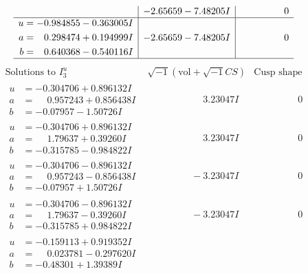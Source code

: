 \documentclass[1p]{elsarticle_modified}
\theoremstyle{definition}
\newcommand{\I}{\sqrt{-1}}
\begin{document}
$$\begin{array}{c|c|c}
 & -2.65659 - 7.48205 I & \phantom{-0.000000 } 0 \\ \hline\begin{aligned}
u &= -0.984855 - 0.363005 I \\
a &= \phantom{-}0.298474 + 0.194999 I \\
b &= \phantom{-}0.640368 - 0.540116 I\end{aligned}
 & -2.65659 - 7.48205 I & \phantom{-0.000000 } 0\\
 \hline 
 \end{array}$$\newpage$$\begin{array}{c|c|c}  
\text{Solutions to }I^u_{3}& \I (\text{vol} + \sqrt{-1}CS) & \text{Cusp shape}\\
 \hline 
\begin{aligned}
u &= -0.304706 + 0.896132 I \\
a &= \phantom{-}0.957243 + 0.856438 I \\
b &= -0.07957 - 1.50726 I\end{aligned}
 & \phantom{-0.000000 -}3.23047 I & \phantom{-0.000000 } 0 \\ \hline\begin{aligned}
u &= -0.304706 + 0.896132 I \\
a &= \phantom{-}1.79637 + 0.39260 I \\
b &= -0.315785 - 0.984822 I\end{aligned}
 & \phantom{-0.000000 -}3.23047 I & \phantom{-0.000000 } 0 \\ \hline\begin{aligned}
u &= -0.304706 - 0.896132 I \\
a &= \phantom{-}0.957243 - 0.856438 I \\
b &= -0.07957 + 1.50726 I\end{aligned}
 & \phantom{-0.000000 } -3.23047 I & \phantom{-0.000000 } 0 \\ \hline\begin{aligned}
u &= -0.304706 - 0.896132 I \\
a &= \phantom{-}1.79637 - 0.39260 I \\
b &= -0.315785 + 0.984822 I\end{aligned}
 & \phantom{-0.000000 } -3.23047 I & \phantom{-0.000000 } 0 \\ \hline\begin{aligned}
u &= -0.159113 + 0.919352 I \\
a &= \phantom{-}0.023781 - 0.297620 I \\
b &= -0.48301 + 1.39389 I\end{aligned}

\end{array}$$
\end{document}
